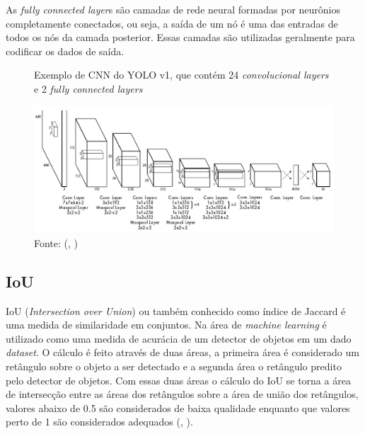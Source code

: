 \documentclass[]{politex}
\begin{document}
As \textit{fully connected layer}s são camadas de rede neural formadas por neurônios completamente conectados, ou seja, a saída de um nó é uma das entradas de todos os nós da camada posterior. Essas camadas são utilizadas geralmente para codificar os dados de saída.

\begin{figure}[H]
    \centering
    \caption{Exemplo de CNN do YOLO v1, que contém 24 \textit{convolucional layers} e 2 \textit{fully connected layers}}
    \includegraphics[width=\textwidth]{arquitetura_yolo}
    \caption*{Fonte: (, \citeyear{yolov1})}
    \label{fig:arq_yolo}
\end{figure}

\subsection{IoU}
IoU (\textit{Intersection over Union}) ou também conhecido como índice de Jaccard é uma medida de similaridade em conjuntos. Na área de \textit{machine learning} é utilizado como uma medida de acurácia de um detector de objetos em um dado \textit{dataset}. O cálculo é feito através de duas áreas, a primeira área é considerado um retângulo sobre o objeto a ser detectado e a segunda área o retângulo predito pelo detector de objetos. Com essas duas áreas o cálculo do IoU se torna a área de intersecção entre as áreas dos retângulos sobre a área de união dos retângulos, valores abaixo de 0.5 são considerados de baixa qualidade enquanto que valores perto de 1 são considerados adequados (, \citeyear{iou}).
\end{document}
